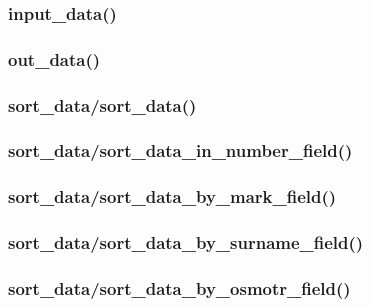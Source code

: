 \documentclass[12pt, a4paper]{article}
\begin{document}
\subsubsection{input\_data()}



\subsubsection{out\_data()}



\subsubsection{sort\_data/sort\_data()}



\subsubsection{sort\_data/sort\_data\_in\_number\_field()}



\subsubsection{sort\_data/sort\_data\_by\_mark\_field()}



\subsubsection{sort\_data/sort\_data\_by\_surname\_field()}



\subsubsection{sort\_data/sort\_data\_by\_osmotr\_field()}


\end{document}
